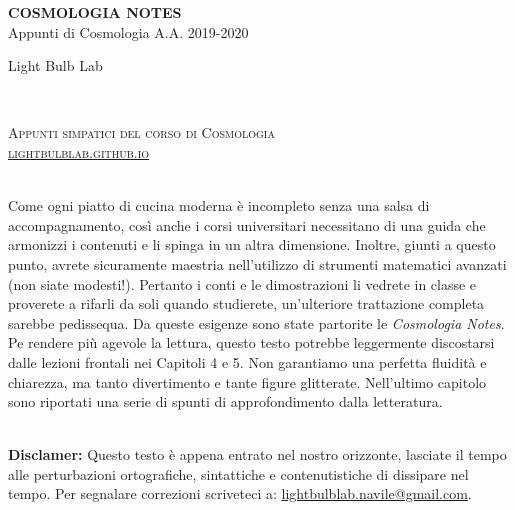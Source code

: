 \documentclass[11pt,fleqn]{book} %
\begin{document}

\begingroup
\thispagestyle{empty}
\centering
\vspace*{5cm}
\par\normalfont\fontsize{35}{35}\sffamily\selectfont
\textbf{COSMOLOGIA NOTES}\\
{\LARGE Appunti di Cosmologia A.A. 2019-2020}\par %
\vspace*{1cm}
{\Huge Light Bulb Lab}\par %
\endgroup


\newpage
~\vfill
\thispagestyle{empty}

\noindent \textsc{Appunti simpatici del corso di Cosmologia} \\

\noindent \textsc{\href{https://lightbulblab.github.io}{lightbulblab.github.io}} \\ %

~\vfill

\noindent Come ogni piatto di cucina moderna è incompleto senza una salsa di accompagnamento, così anche i corsi universitari necessitano di una guida che armonizzi i contenuti e li spinga in un altra dimensione. Inoltre, giunti a questo punto, avrete sicuramente maestria nell'utilizzo di strumenti matematici avanzati (non siate modesti!). Pertanto i conti e le dimostrazioni li vedrete in classe e proverete a rifarli da soli quando studierete, un'ulteriore trattazione completa sarebbe pedissequa.  Da queste esigenze sono state partorite le \textit{Cosmologia Notes}. Pe rendere più agevole la lettura, questo testo potrebbe leggermente discostarsi dalle lezioni frontali nei Capitoli 4 e 5. Non garantiamo una perfetta fluidità e chiarezza, ma tanto divertimento e tante figure glitterate. Nell'ultimo capitolo sono riportati una serie di spunti di approfondimento dalla letteratura.  \\ %

~\vfill

\noindent \textbf{Disclamer:} Questo testo è appena entrato nel nostro orizzonte, lasciate il tempo alle perturbazioni ortografiche, sintattiche e contenutistiche di dissipare nel tempo. Per segnalare correzioni scriveteci a: \href{mailto:lightbulblab.navile@gmail.com}{lightbulblab.navile@gmail.com}. \\
\end{document}
